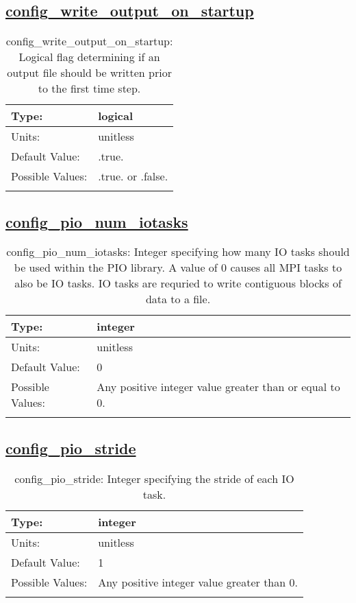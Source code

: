 \subsection[config\_write\_output\_on\_startup]{\hyperref[sec:nm_tab_io]{config\_write\_output\_on\_startup}}
\label{subsec:nm_sec_config_write_output_on_startup}
\begin{center}
\begin{longtable}{| p{2.0in} || p{4.0in} |}
    \hline
    Type: & logical \\
    \hline
    Units: & \si{unitless} \\
    \hline
    Default Value: & .true. \\
    \hline
    Possible Values: & .true. or .false. \\
    \hline
    \caption{config\_write\_output\_on\_startup: Logical flag determining if an output file should be written prior to the first time step.}
\end{longtable}
\end{center}
\subsection[config\_pio\_num\_iotasks]{\hyperref[sec:nm_tab_io]{config\_pio\_num\_iotasks}}
\label{subsec:nm_sec_config_pio_num_iotasks}
\begin{center}
\begin{longtable}{| p{2.0in} || p{4.0in} |}
    \hline
    Type: & integer \\
    \hline
    Units: & \si{unitless} \\
    \hline
    Default Value: & 0 \\
    \hline
    Possible Values: & Any positive integer value greater than or equal to 0. \\
    \hline
    \caption{config\_pio\_num\_iotasks: Integer specifying how many IO tasks should be used within the PIO library. A value of 0 causes all MPI tasks to also be IO tasks. IO tasks are requried to write contiguous blocks of data to a file.}
\end{longtable}
\end{center}
\subsection[config\_pio\_stride]{\hyperref[sec:nm_tab_io]{config\_pio\_stride}}
\label{subsec:nm_sec_config_pio_stride}
\begin{center}
\begin{longtable}{| p{2.0in} || p{4.0in} |}
    \hline
    Type: & integer \\
    \hline
    Units: & \si{unitless} \\
    \hline
    Default Value: & 1 \\
    \hline
    Possible Values: & Any positive integer value greater than 0. \\
    \hline
    \caption{config\_pio\_stride: Integer specifying the stride of each IO task.}
\end{longtable}
\end{center}
